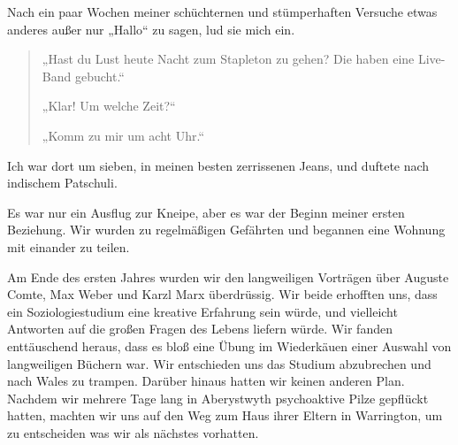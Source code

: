 \documentclass[12pt]{memoir}
\begin{document}
Nach ein paar Wochen meiner schüchternen und stümperhaften Versuche
etwas anderes außer nur „Hallo“ zu sagen, lud sie mich ein.

\begin{quote}
„Hast du Lust heute Nacht zum Stapleton zu gehen?
Die haben eine Live-Band gebucht.“

„Klar! Um welche Zeit?“

„Komm zu mir um acht Uhr.“
\end{quote}

Ich war dort um sieben, in meinen besten zerrissenen Jeans,
und duftete nach indischem Patschuli.

Es war nur ein Ausflug zur Kneipe,
aber es war der Beginn meiner ersten Beziehung.
Wir wurden zu regelmäßigen Gefährten
und begannen eine Wohnung mit einander zu teilen.

Am Ende des ersten Jahres wurden wir den langweiligen Vorträgen über
Auguste Comte, Max Weber und Karzl Marx überdrüssig.
Wir beide erhofften uns, dass ein Soziologiestudium
eine kreative Erfahrung sein würde,
und vielleicht Antworten auf die großen Fragen des Lebens liefern würde.
Wir fanden enttäuschend heraus, dass es bloß eine Übung im Wiederkäuen
einer Auswahl von langweiligen Büchern war.
Wir entschieden uns das Studium abzubrechen und nach Wales zu trampen.
Darüber hinaus hatten wir keinen anderen Plan.
Nachdem wir mehrere Tage lang in Aberystwyth
psychoaktive Pilze gepflückt hatten,
machten wir uns auf den Weg zum Haus ihrer Eltern in Warrington,
um zu entscheiden was wir als nächstes vorhatten.
\end{document}
